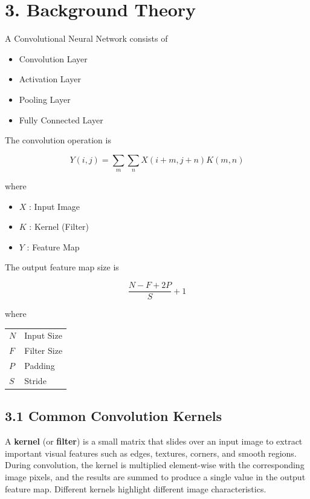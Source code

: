 \documentclass[11pt]{article}
\begin{document}

\section*{3. Background Theory}

A Convolutional Neural Network consists of

\begin{itemize}[leftmargin=*]
\item Convolution Layer
\item Activation Layer
\item Pooling Layer
\item Fully Connected Layer
\end{itemize}

The convolution operation is

\[
Y(i,j)=\sum_m\sum_n X(i+m,j+n)K(m,n)
\]

where

\begin{itemize}[leftmargin=*]
\item $X$ : Input Image
\item $K$ : Kernel (Filter)
\item $Y$ : Feature Map
\end{itemize}

The output feature map size is

\[
\frac{N-F+2P}{S}+1
\]

where

\begin{tabular}{ll}
$N$ & Input Size\\
$F$ & Filter Size\\
$P$ & Padding\\
$S$ & Stride
\end{tabular}

\subsection*{3.1 Common Convolution Kernels}

A \textbf{kernel} (or \textbf{filter}) is a small matrix that slides over an input image to extract important visual features such as edges, textures, corners, and smooth regions. During convolution, the kernel is multiplied element-wise with the corresponding image pixels, and the results are summed to produce a single value in the output feature map. Different kernels highlight different image characteristics.
\end{document}
